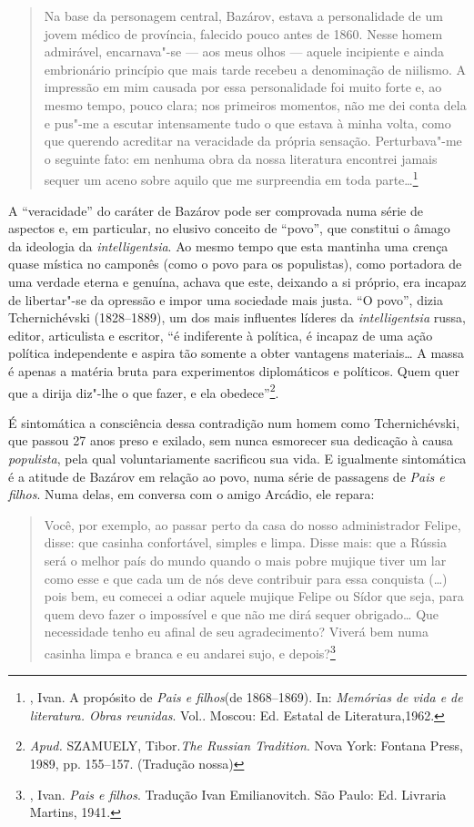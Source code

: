 \begin{quote}
Na base da personagem central, Bazárov, estava a personalidade de um
jovem médico de província, falecido pouco antes de 1860. Nesse homem
admirável, encarnava"-se --- aos meus olhos --- aquele incipiente e ainda
embrionário princípio que mais tarde recebeu a denominação de niilismo.
A impressão em mim causada por essa personalidade foi muito forte e, ao
mesmo tempo, pouco clara; nos primeiros momentos, não me dei conta dela
e pus"-me a escutar intensamente tudo o que estava à minha volta, como
que querendo acreditar na veracidade da própria sensação. Perturbava"-me
o seguinte fato: em nenhuma obra da nossa literatura encontrei jamais
sequer um aceno sobre aquilo que me surpreendia em toda parte\ldots{}\footnote{, Ivan. A propósito de \emph{Pais e filhos}(de 1868--1869). In: \emph{Memórias de vida e de literatura. Obras reunidas}. Vol.. Moscou: Ed. Estatal de Literatura,1962.} 
\end{quote}

A ``veracidade'' do caráter de Bazárov pode ser comprovada numa série de
aspectos e, em particular, no elusivo conceito de ``povo'', que constitui
o âmago da ideologia da \emph{intelligentsia}. Ao mesmo tempo que esta
mantinha uma crença quase mística no camponês (como o povo para os
populistas), como portadora de uma verdade eterna e genuína, achava que
este, deixando a si próprio, era incapaz de libertar"-se da opressão e
impor uma sociedade mais justa. ``O povo'', dizia Tchernichévski (1828--1889), um dos
mais influentes líderes da \emph{intelligentsia} russa, editor,
articulista e escritor, ``é indiferente à política, é incapaz de uma
ação política independente e aspira tão somente a obter vantagens
materiais\ldots{} A massa é apenas a matéria bruta para experimentos diplomáticos e
políticos. Quem quer que a dirija diz"-lhe o que fazer, e ela obedece''\footnote{\emph{Apud.} SZAMUELY, Tibor.\emph{The Russian Tradition}. Nova York: Fontana Press, 1989, pp. 155--157. (Tradução nossa)}.

É sintomática a consciência dessa contradição num homem como
Tchernichévski, que passou 27 anos preso e exilado, sem nunca esmorecer
sua dedicação à causa \emph{populista}, pela qual voluntariamente sacrificou sua
vida. E igualmente sintomática é a atitude de Bazárov em relação ao povo, numa
série de passagens de \emph{Pais e filhos}. Numa delas, em conversa com o amigo Arcádio, ele
repara:

\begin{quote}
Você, por exemplo, ao passar perto da casa do nosso administrador
Felipe, disse: que casinha confortável, simples e limpa. Disse mais: que
a Rússia será o melhor país do mundo quando o mais pobre mujique tiver
um lar como esse e que cada um de nós deve contribuir para essa
conquista (\ldots{}) pois bem, eu comecei a odiar aquele mujique Felipe ou
Sídor que seja, para quem devo fazer o impossível e que não me dirá
sequer obrigado\ldots{} Que necessidade tenho eu afinal de seu
agradecimento? Viverá bem numa casinha limpa e branca e eu andarei sujo,
e depois?\footnote{, Ivan. \emph{Pais e filhos}. Tradução Ivan Emilianovitch. São Paulo: Ed. Livraria Martins, 1941.} 
\end{quote}

